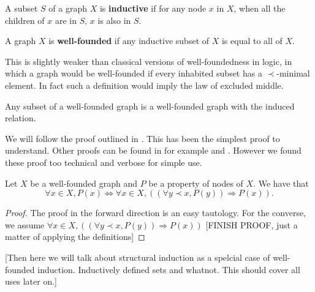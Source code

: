 \begin{defin}
    A subset $S$ of a graph $X$ is \textbf{inductive} if for any node $x$ in $X$, when all the children of $x$ are in $S$, $x$ is also in $S$.
\end{defin}

\begin{defin}
    A graph $X$ is \textbf{well-founded} if any inductive subset of $X$ is equal to all of $X$.
\end{defin}

\begin{remark}
    This is slightly weaker than classical versions of well-foundedness in logic, in which a graph would be well-founded if every inhabited subset has a $\prec$-minimal element. In fact such a definition would imply the law of excluded middle.
\end{remark}

\begin{lemma}\label{sswfg}
    Any subset of a well-founded graph is a well-founded graph with the induced relation.
\end{lemma}

We will follow the proof outlined in \cite{winskel1993formal}. This has been the simplest proof to understand. Other proofs can be found in for example \cite{johnstone1987notes} and \cite[Chapter 7]{barwise1982handbook}. However we found these proof too technical and verbose for simple use.

\begin{theorem}
    Let $X$ be a well-founded graph and $P$ be a property of nodes of $X$.
    We have that $$\forall x \in X, P(x) \Leftrightarrow \forall x \in X,((\forall y \prec x, P(y)) \Rightarrow P(x)).$$
\end{theorem}

\begin{proof}
    The proof in the forward direction is an easy tautology. For the converse, we assume  $ \forall x \in X,((\forall y \prec x, P(y)) \Rightarrow P(x))$ [FINISH PROOF, just a matter of applying the definitions]
\end{proof}

[Then here we will talk about structural induction as a spelcial case of well-founded induction. Inductively defined sets and whatnot. This should cover all uses later on.]
